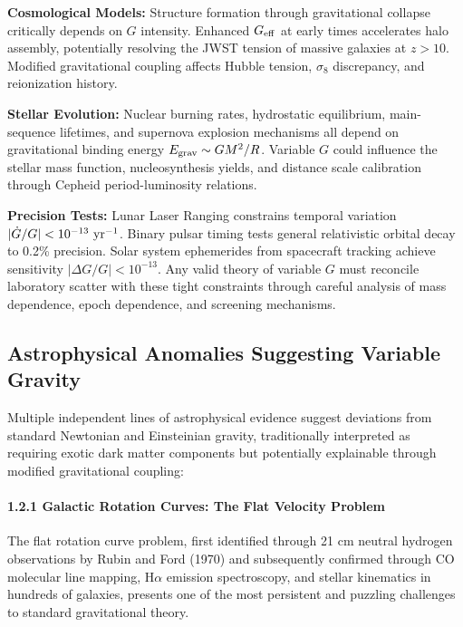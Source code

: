\documentclass[11pt,a4paper]{article}
\begin{document}
\textbf{Cosmological Models:} Structure formation through gravitational
collapse critically depends on \(G\) intensity. Enhanced \(G_{\rm eff}\)
at early times accelerates halo assembly, potentially resolving the JWST
tension of massive galaxies at \(z > 10\). Modified gravitational
coupling affects Hubble tension, \(\sigma_8\) discrepancy, and
reionization history.

\textbf{Stellar Evolution:} Nuclear burning rates, hydrostatic
equilibrium, main-sequence lifetimes, and supernova explosion mechanisms
all depend on gravitational binding energy \(E_{\rm grav} \sim GM^2/R\).
Variable \(G\) could influence the stellar mass function,
nucleosynthesis yields, and distance scale calibration through Cepheid
period-luminosity relations.

\textbf{Precision Tests:} Lunar Laser Ranging constrains temporal
variation \(|\dot{G}/G| < 10^{-13}~{\rm yr^{-1}}\). Binary pulsar timing
tests general relativistic orbital decay to 0.2\% precision. Solar
system ephemerides from spacecraft tracking achieve sensitivity
\(|\Delta G/G| < 10^{-13}\). Any valid theory of variable \(G\) must
reconcile laboratory scatter with these tight constraints through
careful analysis of mass dependence, epoch dependence, and screening
mechanisms.

\hypertarget{astrophysical-anomalies-suggesting-variable-gravity}{%
\subsection{Astrophysical Anomalies Suggesting Variable
Gravity}\label{astrophysical-anomalies-suggesting-variable-gravity}}

Multiple independent lines of astrophysical evidence suggest deviations
from standard Newtonian and Einsteinian gravity, traditionally
interpreted as requiring exotic dark matter components but potentially
explainable through modified gravitational coupling:

\hypertarget{galactic-rotation-curves-the-flat-velocity-problem}{%
\paragraph{1.2.1 Galactic Rotation Curves: The Flat Velocity
Problem}\label{galactic-rotation-curves-the-flat-velocity-problem}}

The flat rotation curve problem, first identified through 21 cm neutral
hydrogen observations by Rubin and Ford (1970) and subsequently
confirmed through CO molecular line mapping, H$\alpha$ emission spectroscopy,
and stellar kinematics in hundreds of galaxies, presents one of the most
persistent and puzzling challenges to standard gravitational theory.
\end{document}
